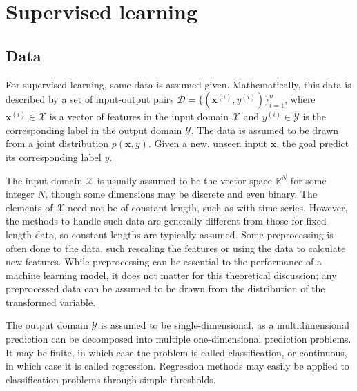 \section{Supervised learning}
\label{sec:supervised_learning}

\subsection{Data}
For supervised learning, some data is assumed given.
Mathematically, this data is described by a set of input-output pairs $\mathcal{D} = \{(\bm{x}^{(i)}, y^{(i)})\}_{i=1}^n$, where $\bm{x}^{(i)} \in\mathcal{X}$ is a vector of features in the input domain $\mathcal{X}$ and $y^{(i)}\in\mathcal{Y}$ is the corresponding label in the output domain $\mathcal{Y}$.
The data is assumed to be drawn from a joint distribution $p(\bm{x}, y)$.
Given a new, unseen input $\bm{x}$, the goal predict its corresponding label $y$.

The input domain $\mathcal{X}$ is usually assumed to be the vector space $\mathbb{R}^N$ for some integer $N$, though some dimensions may be discrete and even binary.
The elements of $\mathcal{X}$ need not be of constant length, such as with time-series.
However, the methods to handle such data are generally different from those for fixed-length data, so constant lengths are typically assumed.
Some preprocessing is often done to the data, such rescaling the features or using the data to calculate new features.
While preprocessing can be essential to the performance of a machine learning model, it does not matter for this theoretical discussion; any preprocessed data can be assumed to be drawn from the distribution of the transformed variable.

The output domain $\mathcal{Y}$ is assumed to be single-dimensional, as a multidimensional prediction can be decomposed into multiple one-dimensional prediction problems.
It may be finite, in which case the problem is called classification, or continuous, in which case it is called regression.
Regression methods may easily be applied to classification problems through simple thresholds.

